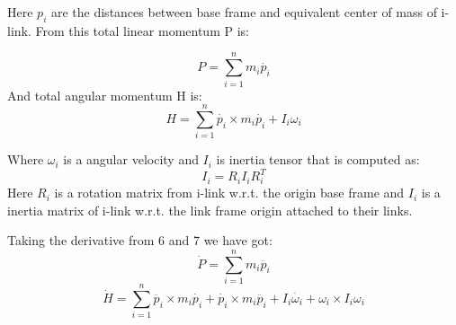 \documentclass[11pt,a4paper]{article}
\begin{document}
Here $p_i$ are the distances between base frame and equivalent center of mass of i-link. From this total linear momentum P is:
	
	\begin{equation}
		P = \sum^n_{i=1}{m_i \dot{p_i}}
	\end{equation}
And total angular momentum H is:
	\begin{equation}
		H = \sum^n_{i=1}{\dot{p_i} \times m_i \dot{p_i} + I_i \omega_i}
	\end{equation}

Where $\omega_i$ is a angular velocity and $I_i$ is inertia tensor that is computed as:
	\begin{equation}
		I_i = R_i I_i R_i^T
	\end{equation}
Here $R_i$ is a rotation matrix from i-link w.r.t. the origin base frame and $I_i$ is a inertia matrix of i-link w.r.t. the link frame origin attached to their links.

Taking the derivative from 6 and 7 we have got:
	\begin{equation}
		\dot{P} = \sum^n_{i=1}{m_i \ddot{p_i}}
	\end{equation}
	\begin{equation}
		\dot{H} = \sum^n_{i=1}{\ddot{p_i} \times m_i \dot{p_i} + \dot{p_i} \times m_i \ddot{p_i} + I_i \dot{\omega_i}} + \omega_i \times I_i \omega_i
	\end{equation}
\end{document}
